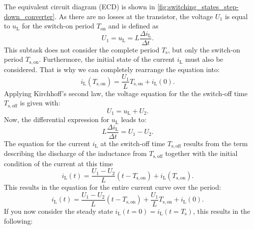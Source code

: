 \begin{solutionblock}
    
    The equivalent circuit diagram (ECD) is shown in \autoref{fig:switching_states_step-down_converter}.
    As there are no losses at the transistor, the voltage $U_{\mathrm{1}}$ is equal to $u_{\mathrm{L}}$ for the switch-on period $T_{\mathrm{on}}$ and is defined as
    \begin{equation}
        U_{\mathrm{1}} = u_{\mathrm{L}} = L \frac{\Delta i_{\mathrm{L}} }{\Delta t}. 
    \end{equation}
    This subtask does not consider the complete period $T_{\mathrm{s}}$, but only the switch-on period $T_{\mathrm{s,on}}$. Furthermore, the initial state of the current $i_{\mathrm{L}}$ must also be considered.
    That is why we can completely rearrange the equation into:
    \begin{equation}
        i_{\mathrm{L}}(T_{\mathrm{s,on}}) =  \frac{U_{\mathrm{1}} }{L}T_{\mathrm{s,on}} +  i_{\mathrm{L}}(0).
    \end{equation}
    Applying Kirchhoff's second law, the voltage equation for the  the switch-off time $T_{\mathrm{s,off}}$ is given with:
    \begin{equation}
        U_{\mathrm{1}} = u_{\mathrm{L}} + U_{\mathrm{2}}.
    \end{equation}
    Now, the differential expression for $u_{\mathrm{L}}$ leads to:
    \begin{equation}
        L \frac{\Delta i_{\mathrm{L}} }{\Delta t} = U_{\mathrm{1}} - U_{\mathrm{2}}.
    \end{equation}
    The equation for the current $i_{\mathrm{L}}$ at the switch-off time $T_{\mathrm{s,off}}$ results from the term describing the discharge of the inductance from $T_{\mathrm{s,off}}$ together with the initial condition of the current at this time
    \begin{equation}
        i_{\mathrm{L}}(t) = \frac{U_{\mathrm{1}}-U_{\mathrm{2}} }{L} (t-T_{\mathrm{s,on}})+i_{\mathrm{L}}(T_{\mathrm{s,on}}).
    \end{equation}
    This results in the equation for the entire current curve over the period: 
    \begin{equation}
        i_{\mathrm{L}}(t) = \frac{U_{\mathrm{1}}-U_{\mathrm{2}} }{L} (t-T_{\mathrm{s,on}})+\frac{U_{\mathrm{1}}}{L}T_{\mathrm{s,on}}+i_{\mathrm{L}}(0).
    \end{equation}
    If you now consider the steady state $i_{\mathrm{L}}(t=0)=i_{\mathrm{L}}(t=T_{\mathrm{s}})$, this results in the following:

\end{solutionblock}
